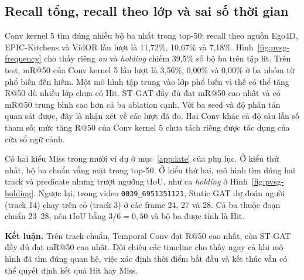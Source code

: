 \subsection{Recall tổng, recall theo lớp và sai số thời gian}
Conv kernel 5 tìm đúng nhiều bộ ba nhất trong top-50; recall theo nguồn Ego4D,
EPIC-Kitchens và VidOR lần lượt là 11,72\%, 10,67\% và 7,18\%.
Hình~\ref{fig:pvsg-frequency} cho thấy riêng \textit{on} và \textit{holding}
chiếm 39,5\% số bộ ba trên tập fit. Trên test, mR@50 của Conv kernel 5
lần lượt là 3,56\%, 0,00\% và 0,00\% ở ba nhóm từ phổ biến đến hiếm.
Một mô hình tập trung vào lớp phổ biến vì thế có thể tăng R@50 dù nhiều lớp
chưa có Hit. ST-GAT đầy đủ đạt mR@50 cao nhất và có mR@50 trung bình cao hơn cả
ba ablation cạnh. Với ba seed và độ phân tán quan sát được, đây là nhận xét
về các lượt đã đo. Hai Conv khác cả độ sâu lẫn số tham số; mức tăng R@50
của Conv kernel 5 chưa tách riêng được tác dụng của cửa sổ ngữ cảnh.

Có hai kiểu Miss trong mười ví dụ ở mục~\ref{app:late} của phụ lục. Ở kiểu thứ nhất,
bộ ba chuẩn vắng mặt trong top-50. Ở kiểu thứ hai, mô hình tìm đúng hai track
và predicate nhưng trượt ngưỡng tIoU, như ca \textit{holding} ở
Hình~\ref{fig:pvsg-holding}. Ngược lại, trong video \texttt{0039\_6951351121},
Static GAT dự đoán người (track 14) chạy trên cỏ (track 3) ở các frame 24,
27 và 28. Cả ba thuộc đoạn chuẩn 23--28, nên tIoU bằng $3/6=0{,}50$ và
bộ ba được tính là Hit.

\textbf{Kết luận.} Trên track chuẩn, Temporal Conv đạt R@50 cao nhất, còn
ST-GAT đầy đủ đạt mR@50 cao nhất. Đối chiếu các timeline cho thấy ngay cả khi
mô hình đã tìm đúng quan hệ, việc xác định thời điểm bắt đầu và kết thúc vẫn
có thể quyết định kết quả Hit hay Miss.
